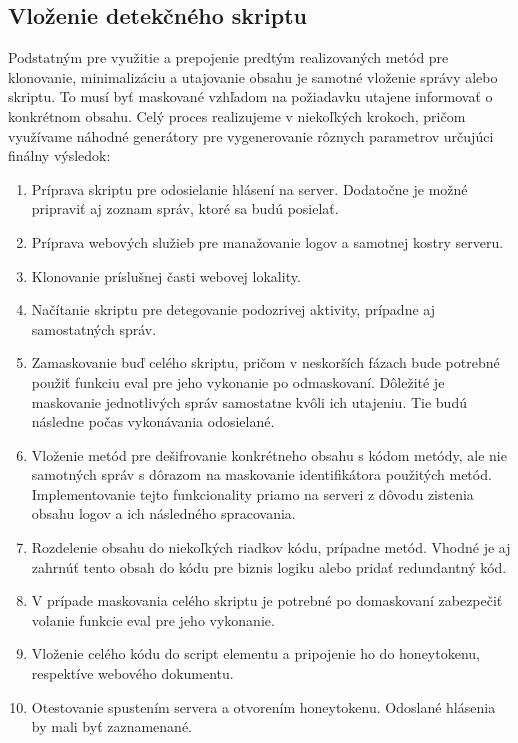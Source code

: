 \documentclass[conference, 11pt,slovak,a4paper,twoside]{IEEEtran}
\begin{document}
\subsection{Vloženie detekčného skriptu}

Podstatným pre využitie a prepojenie predtým realizovaných metód pre klonovanie, minimalizáciu a utajovanie obsahu je samotné vloženie správy alebo skriptu. To musí byť maskované vzhľadom na požiadavku utajene informovať o konkrétnom obsahu. Celý proces realizujeme v niekoľkých krokoch, pričom využívame náhodné generátory pre vygenerovanie rôznych parametrov určujúci finálny výsledok:


\begin{enumerate}
	\item Príprava skriptu pre odosielanie hlásení na server. Dodatočne je možné pripraviť aj zoznam správ, ktoré sa budú posielať.

	\item Príprava webových služieb pre manažovanie logov a samotnej kostry serveru.
	
	\item Klonovanie príslušnej časti webovej lokality.
	
	\item Načítanie skriptu pre detegovanie podozrivej aktivity, prípadne aj samostatných správ. 
	
	\item Zamaskovanie buď celého skriptu, pričom v neskorších fázach bude potrebné použiť funkciu eval pre jeho vykonanie po odmaskovaní. Dôležité je maskovanie jednotlivých správ samostatne kvôli ich utajeniu. Tie budú následne počas vykonávania odosielané. 
	
	\item Vloženie metód pre dešifrovanie konkrétneho obsahu s kódom metódy, ale nie samotných správ s dôrazom na maskovanie identifikátora použitých metód. Implementovanie tejto funkcionality priamo na serveri z dôvodu zistenia obsahu logov a ich následného spracovania.
	
	\item Rozdelenie obsahu do niekoľkých riadkov kódu, prípadne metód. Vhodné je aj zahrnúť tento obsah do kódu pre biznis logiku alebo pridať redundantný kód.
	
	\item V prípade maskovania celého skriptu je potrebné po domaskovaní zabezpečiť volanie funkcie eval pre jeho vykonanie.
	
	\item Vloženie celého kódu do script elementu a pripojenie ho do honeytokenu, respektíve webového dokumentu.
	
	\item Otestovanie spustením servera a otvorením honeytokenu. Odoslané hlásenia by mali byť zaznamenané.
\end{enumerate}
\end{document}
